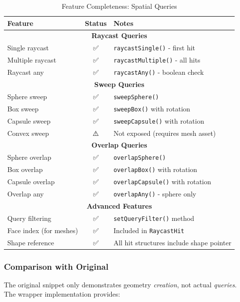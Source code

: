 \begin{table}[h]
\centering
\begin{tabular}{|l|c|p{6cm}|}
\hline
\textbf{Feature} & \textbf{Status} & \textbf{Notes} \\
\hline
\multicolumn{3}{|c|}{\textbf{Raycast Queries}} \\
\hline
Single raycast & ✅ & \texttt{raycastSingle()} - first hit \\
\hline
Multiple raycast & ✅ & \texttt{raycastMultiple()} - all hits \\
\hline
Raycast any & ✅ & \texttt{raycastAny()} - boolean check \\
\hline
\multicolumn{3}{|c|}{\textbf{Sweep Queries}} \\
\hline
Sphere sweep & ✅ & \texttt{sweepSphere()} \\
\hline
Box sweep & ✅ & \texttt{sweepBox()} with rotation \\
\hline
Capsule sweep & ✅ & \texttt{sweepCapsule()} with rotation \\
\hline
Convex sweep & ⚠️ & Not exposed (requires mesh asset) \\
\hline
\multicolumn{3}{|c|}{\textbf{Overlap Queries}} \\
\hline
Sphere overlap & ✅ & \texttt{overlapSphere()} \\
\hline
Box overlap & ✅ & \texttt{overlapBox()} with rotation \\
\hline
Capsule overlap & ✅ & \texttt{overlapCapsule()} with rotation \\
\hline
Overlap any & ✅ & \texttt{overlapAny()} - sphere only \\
\hline
\multicolumn{3}{|c|}{\textbf{Advanced Features}} \\
\hline
Query filtering & ✅ & \texttt{setQueryFilter()} method \\
\hline
Face index (for meshes) & ✅ & Included in \texttt{RaycastHit} \\
\hline
Shape reference & ✅ & All hit structures include shape pointer \\
\hline
\end{tabular}
\caption{Feature Completeness: Spatial Queries}
\end{table}

\subsubsection{Comparison with Original}

The original snippet only demonstrates geometry \textit{creation}, not actual \textit{queries}. The wrapper implementation provides:

